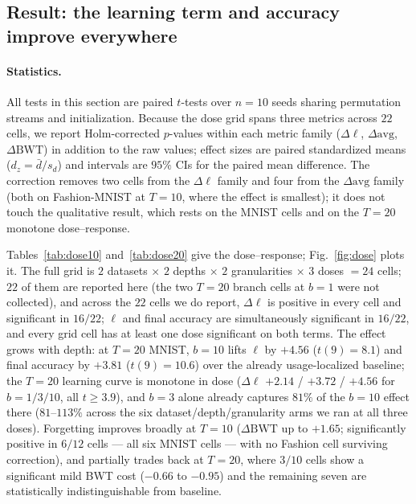 \documentclass[10pt]{article}
\begin{document}
\subsection{Result: the learning term and accuracy improve everywhere}
\label{sec:dosestat}

\paragraph{Statistics.} All tests in this section are paired $t$-tests over $n=10$ seeds sharing permutation streams and initialization. Because the dose grid spans three metrics across $22$ cells, we report Holm-corrected $p$-values within each metric family ($\Delta\ell$, $\Delta\mathrm{avg}$, $\Delta\mathrm{BWT}$) in addition to the raw values; effect sizes are paired standardized means ($d_z=\bar{d}/s_d$) and intervals are $95\%$ CIs for the paired mean difference. The correction removes two cells from the $\Delta\ell$ family and four from the $\Delta\mathrm{avg}$ family (both on Fashion-MNIST at $T=10$, where the effect is smallest); it does not touch the qualitative result, which rests on the MNIST cells and on the $T=20$ monotone dose--response.

Tables~\ref{tab:dose10} and~\ref{tab:dose20} give the dose--response;
Fig.~\ref{fig:dose} plots it. The full grid is
$2$ datasets $\times$ $2$ depths $\times$ $2$ granularities $\times$
$3$ doses $=24$ cells; $22$ of them are reported here (the two
$T{=}20$ branch cells at $b{=}1$ were not collected), and across the $22$
cells we do report, $\Delta\ell$ is positive in every cell and
significant in
$16/22$; $\ell$ and final accuracy are simultaneously
significant in $16/22$, and every grid cell has at least one dose
significant on both terms. The effect grows with depth: at $T{=}20$ MNIST,
$b{=}10$ lifts $\ell$ by $+4.56$ ($t(9){=}8.1$) and final accuracy by
$+3.81$ ($t(9){=}10.6$) over the already usage-localized baseline; the
$T{=}20$ learning curve is monotone in dose
($\Delta\ell$ $+2.14$ / $+3.72$ / $+4.56$ for $b{=}1/3/10$, all
$t \ge 3.9$), and $b{=}3$ alone already captures $81\%$ of the
$b{=}10$ effect there ($81$--$113\%$ across the six dataset/depth/granularity
arms we ran at all three doses). Forgetting
improves broadly at $T{=}10$ ($\Delta\mathrm{BWT}$ up to $+1.65$;
significantly positive in $6/12$ cells --- all six MNIST cells --- with
      no Fashion cell surviving correction), and
partially trades back at $T{=}20$, where $3/10$ cells show a significant
mild BWT cost ($-0.66$ to $-0.95$) and the remaining seven are
statistically indistinguishable from baseline.
\end{document}
